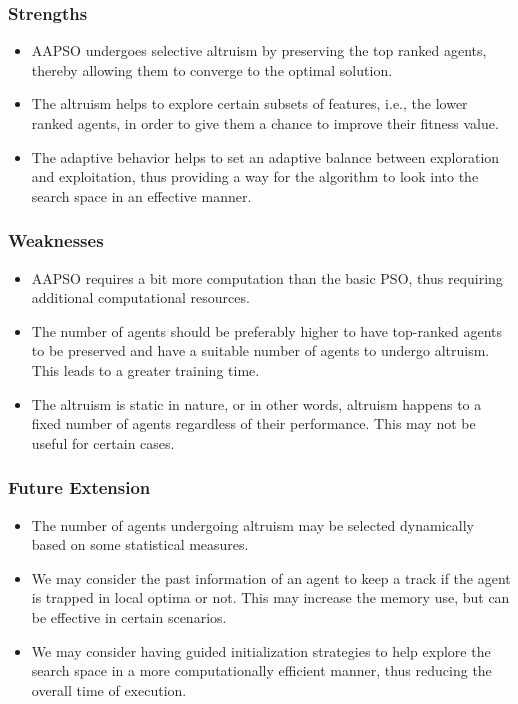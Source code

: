 \documentclass[final,3p,times]{elsarticle}
\begin{document}
\subsubsection{Strengths}
{
\begin{itemize}
    \item AAPSO undergoes selective altruism by preserving the top ranked agents, thereby allowing them to converge to the optimal solution.
    \item The altruism helps to explore certain subsets of features, i.e., the lower ranked agents, in order to give them a chance to improve their fitness value.
    \item The adaptive behavior helps to set an adaptive balance between exploration and exploitation, thus providing a way for the algorithm to look into the search space in an effective manner.
\end{itemize}}
\subsubsection{Weaknesses}
{
\begin{itemize}
    \item AAPSO requires a bit more computation than the basic PSO, thus requiring additional computational resources.
    \item The number of agents should be preferably higher  to have top-ranked agents to be preserved and have a suitable number of agents to undergo altruism. This leads to a greater training time.
    \item The altruism is static in nature, or in other words, altruism happens to a fixed number of agents regardless of their performance. This may not be useful for certain cases.  
\end{itemize}
}
\subsubsection{Future Extension}
{\begin{itemize}
    \item The number of agents undergoing altruism may be selected dynamically based on some statistical measures.
    \item We may consider the past information of an agent to keep a track if the agent is trapped in local optima or not. This may increase the memory use, but can be effective in certain scenarios.
    \item We may consider having guided initialization strategies to help explore the search space in a more computationally efficient manner, thus reducing the overall time of execution.
\end{itemize}}
\end{document}
